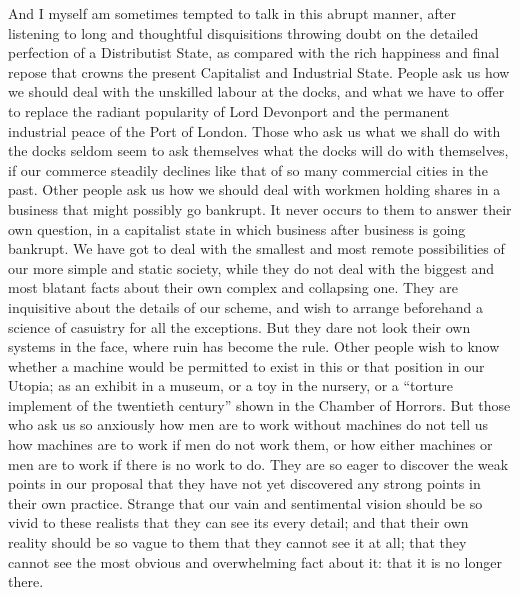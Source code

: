 \documentclass{book}
\begin{document}
And I myself am sometimes tempted to talk in this abrupt manner, after listening to long and thoughtful disquisitions throwing doubt on the detailed perfection of a Distributist State, as compared with the rich happiness and final repose that crowns the present Capitalist and Industrial State. People ask us how we should deal with the unskilled labour at the docks, and what we have to offer to replace the radiant popularity of Lord Devonport and the permanent industrial peace of the Port of London. Those who ask us what we shall do with the docks seldom seem to ask themselves what the docks will do with themselves, if our commerce steadily declines like that of so many commercial cities in the past. Other people ask us how we should deal with workmen holding shares in a business that might possibly go bankrupt. It never occurs to them to answer their own question, in a capitalist state in which business after business is going bankrupt. We have got to deal with the smallest and most remote possibilities of our more simple and static society, while they do not deal with the biggest and most blatant facts about their own complex and collapsing one. They are inquisitive about the details of our scheme, and wish to arrange beforehand a science of casuistry for all the exceptions. But they dare not look their own systems in the face, where ruin has become the rule. Other people wish to know whether a machine would be permitted to exist in this or that position in our Utopia; as an exhibit in a museum, or a toy in the nursery, or a “torture implement of the twentieth century” shown in the Chamber of Horrors. But those who ask us so anxiously how men are to work without machines do not tell us how machines are to work if men do not work them, or how either machines or men are to work if there is no work to do. They are so eager to discover the weak points in our proposal that they have not yet discovered any strong points in their own practice. Strange that our vain and sentimental vision should be so vivid to these realists that they can see its every detail; and that their own reality should be so vague to them that they cannot see it at all; that they cannot see the most obvious and overwhelming fact about it: that it is no longer there.
\end{document}
